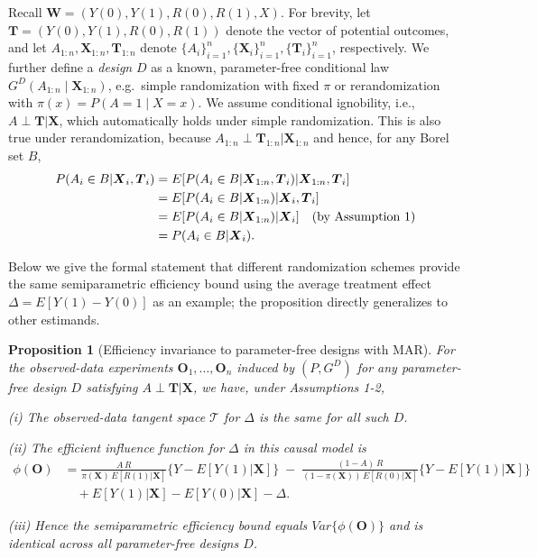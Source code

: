 \documentclass[12pt]{article}
\newtheorem{proposition}{Proposition}
\newcommand{\bX}{\boldsymbol{X}}
\newcommand{\bO}{\boldsymbol{O}}
\newcommand{\bW}{\boldsymbol{W}}
\newcommand{\bT}{\boldsymbol{T}}
\begin{document}
Recall $\bW=(Y(0),Y(1),R(0),R(1), X)$. For brevity, let $\bT = (Y(0),Y(1),R(0),R(1))$ denote the vector of potential outcomes, and let $A_{1:n}, \bX_{1:n}, \bT_{1:n}$ denote $\{A_i\}_{i=1}^n, \{\bX_i\}_{i=1}^n, \{\bT_i\}_{i=1}^n$, respectively.  We further define a \emph{design} $D$ as a known, parameter-free conditional law
$G^D(A_{1:n}\mid \bX_{1:n})$, e.g.\ simple randomization with fixed $\pi$ or rerandomization with $\pi(x)=P(A=1\mid X=x)$.  We assume conditional ignobility, i.e., $A\perp \bT |\bX$, which automatically holds under simple randomization. This is also true under rerandomization, because $A_{1:n}\perp \bT_{1:n} | \bX_{1:n}$ and hence, for any Borel set $B$,
\begin{align*}
    P(A_i \in B | \bX_i, \bT_i) &= E[P(A_i\in B |\bX_{1:n}, \bT_i)|\bX_{1:n}, \bT_i] \\
    &= E[P(A_i\in B |\bX_{1:n})|\bX_i, \bT_i]\\
    &= E[P(A_i\in B |\bX_{1:n})|\bX_i] \quad \textup{(by Assumption 1)} \\
    &= P(A_i \in B | \bX_i).
\end{align*}

Below we give the formal statement that different randomization schemes provide the same semiparametric efficiency bound using the average treatment effect $\Delta = E[Y(1)-Y(0)]$ as an example; the proposition directly generalizes to other estimands.

\begin{proposition}[Efficiency invariance to parameter-free designs with MAR]\label{prop:inv-paramfree-R}
For the observed-data experiments $\bO_1,\dots, \bO_n$ induced by $(P,G^D)$ for any parameter-free design $D$ satisfying $A\perp \bT |\bX$, we have, under Assumptions 1-2,

\noindent (i) The observed-data tangent space $\mathcal T$ for $\Delta$ is the same for all such $D$.

\noindent (ii) The efficient influence function for $\Delta$ in this causal model is
\begin{align*}
\phi(\bO)&=
\frac{A\,R}{\pi(\bX)\,E[R(1)|\bX]}\{Y-E[Y(1)|\bX]\}
\;-\;\frac{(1-A)\,R}{(1-\pi(\bX))\,E[R(0)|\bX]}\{Y-E[Y(1)|\bX]\} \\
&\quad + E[Y(1)|\bX]-E[Y(0)|\bX]-\Delta.
\end{align*}

\noindent (iii) Hence the semiparametric efficiency bound equals $Var\{\phi(\bO)\}$ and is identical across all parameter-free designs $D$.
\end{proposition}
\end{document}

